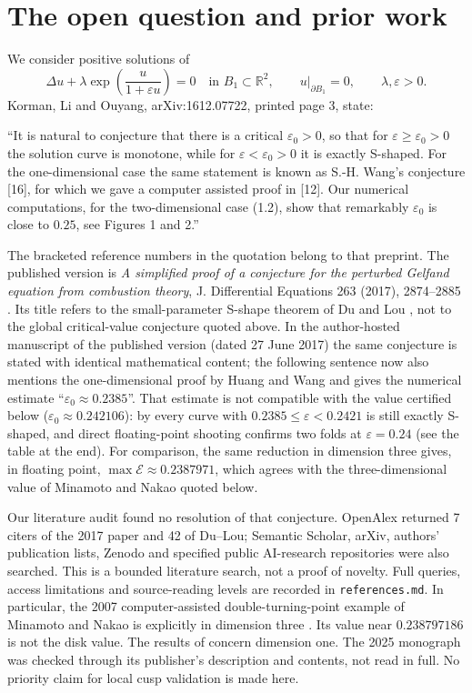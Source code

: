 \documentclass[11pt,a4paper]{report}
\begin{document}
\section*{The open question and prior work}
We consider positive solutions of
\begin{equation}\label{eq:pde}
 \Delta u+\lambda\exp\!\left(\frac{u}{1+\varepsilon u}\right)=0
 \quad\text{in }B_1\subset\mathbb R^2,\qquad u|_{\partial B_1}=0,
 \qquad \lambda,\varepsilon>0.
\end{equation}
Korman, Li and Ouyang, arXiv:1612.07722, printed page 3, state:
\begin{openquote}
``It is natural to conjecture that there is a critical $\varepsilon_0>0$, so that
for $\varepsilon\geq\varepsilon_0>0$ the solution curve is monotone, while for
$\varepsilon<\varepsilon_0>0$ it is exactly S-shaped. For the one-dimensional
case the same statement is known as S.-H. Wang's conjecture [16], for which we
gave a computer assisted proof in [12]. Our numerical computations, for the
two-dimensional case (1.2), show that remarkably $\varepsilon_0$ is close to
$0.25$, see Figures 1 and 2.''
\end{openquote}
The bracketed reference numbers in the quotation belong to that preprint.
The published version is \emph{A simplified proof of a conjecture for the
perturbed Gelfand equation from combustion theory}, J. Differential Equations
263 (2017), 2874--2885 \autocite{KLO2017}. Its title refers to the small-parameter
S-shape theorem of Du and Lou \autocite{DuLou2001}, not to the global critical-value
conjecture quoted above. In the author-hosted manuscript of the published version
(dated 27 June 2017) the same conjecture is stated with identical mathematical
content; the following sentence now also mentions the one-dimensional proof by
Huang and Wang \autocite{HuangWang2016} and gives the numerical estimate
``$\varepsilon_0\approx0.2385$''. That estimate is not compatible with the value
certified below ($\varepsilon_0\approx0.242106$): by  every curve
with $0.2385\le\varepsilon<0.2421$ is still exactly S-shaped, and direct floating-point
shooting confirms two folds at $\varepsilon=0.24$ (see the table at the end).
For comparison, the same reduction in dimension three gives, in floating point,
$\max\mathcal E\approx0.2387971$, which agrees with the three-dimensional value of
Minamoto and Nakao quoted below.

Our literature audit found no resolution of that conjecture. OpenAlex returned
7 citers of the 2017 paper and 42 of Du--Lou; Semantic Scholar, arXiv, authors'
publication lists, Zenodo and specified public AI-research repositories were
also searched. This is a bounded literature search, not a proof of novelty.
Full queries, access limitations and source-reading levels are recorded in
\texttt{references.md}. In particular, the 2007 computer-assisted double-turning-point
example of Minamoto and Nakao is explicitly in dimension three
\autocite{MinamotoNakao2007}. Its value near $0.238797186$ is not the disk value.
The results of \autocite{HuangWang2016,HuangHungWang2019} concern dimension one.
The 2025 monograph \autocite{Taira2025} was checked through its publisher's
description and contents, not read in full. No priority claim for local cusp
validation is made here.
\end{document}
